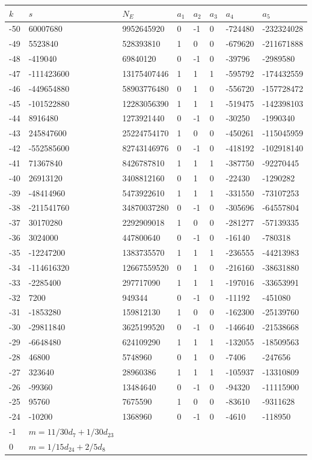 \documentclass{amsart}
\begin{document}
\begin{longtable}{|l|l|l|lllll|}
\hline
$k$ & $s$ & $N_E$ & $a_1$ & $a_2$ & $a_3$ & $a_4$ & $a_5$\\
\hline
-50&60007680&9952645920&0&-1&0&-724480&-232324028\\
-49&5523840&528393810&1&0&0&-679620&-211671888\\
-48&-419040&69840120&0&-1&0&-39796&-2989580\\
-47&-111423600&13175407446&1&1&1&-595792&-174432559\\
-46&-449654880&58903776480&0&1&0&-556720&-157728472\\
-45&-101522880&12283056390&1&1&1&-519475&-142398103\\
-44&8916480&1273921440&0&-1&0&-30250&-1990340\\
-43&245847600&25224754170&1&0&0&-450261&-115045959\\
-42&-552585600&82743146976&0&-1&0&-418192&-102918140\\
-41&71367840&8426787810&1&1&1&-387750&-92270445\\
-40&26913120&3408812160&0&1&0&-22430&-1290282\\
-39&-48414960&5473922610&1&1&1&-331550&-73107253\\
-38&-211541760&34870037280&0&-1&0&-305696&-64557804\\
-37&30170280&2292909018&1&0&0&-281277&-57139335\\
-36&3024000&447800640&0&-1&0&-16140&-780318\\
-35&-12247200&1383735570&1&1&1&-236555&-44213983\\
-34&-114616320&12667559520&0&1&0&-216160&-38631880\\
-33&-2285400&297717090&1&1&1&-197016&-33653991\\
-32&7200&949344&0&-1&0&-11192&-451080\\
-31&-1853280&159812130&1&0&0&-162300&-25139760\\
-30&-29811840&3625199520&0&-1&0&-146640&-21538668\\
-29&-6648480&624109290&1&1&1&-132055&-18509563\\
-28&46800&5748960&0&1&0&-7406&-247656\\
-27&323640&28960386&1&1&1&-105937&-13310809\\
-26&-99360&13484640&0&-1&0&-94320&-11115900\\
-25&95760&7675590&1&0&0&-83610&-9311628\\
-24&-10200&1368960&0&-1&0&-4610&-118950\\
-1&$m=11/30d_{7}+1/30d_{23}$&&\multicolumn{5}{c|}{}\\
0&$m=1/15d_{24}+2/5d_{8}$&&\multicolumn{5}{c|}{}\\
\hline
\end{longtable}
\end{document}
